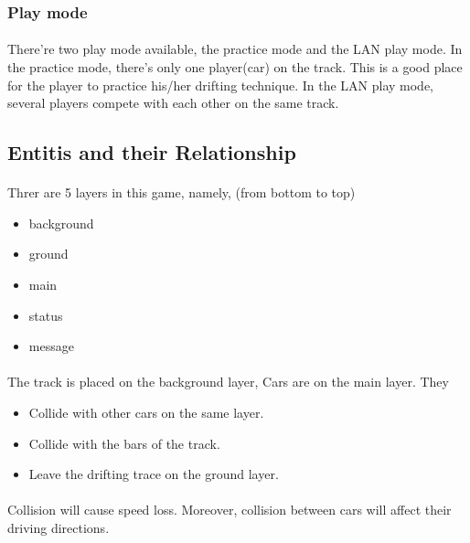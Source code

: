 \documentclass{article}
\begin{document}
        \subsubsection*{Play mode}
        \paragraph{}
            There're two play mode available, the practice mode and the LAN play mode.
            In the practice mode, there's only one player(car) on the track. This is a good place for the player to practice his/her drifting technique.
            In the LAN play mode, several players compete with each other on the same track.
    \subsection{Entitis and their Relationship}
    \paragraph{}
        Threr are 5 layers in this game, namely, (from bottom to top)
    \\
        \begin{itemize}
            \item background
            \item ground
            \item main
            \item status
            \item message
        \end{itemize}
    \paragraph{}
        The track is placed on the background layer, Cars are on the main layer. They
    \\
        \begin{itemize}
            \item Collide with other cars on the same layer.
            \item Collide with the bars of the track.
            \item Leave the drifting trace on the ground layer.
        \end{itemize}
    \paragraph{}
        Collision will cause speed loss. Moreover, collision between cars will affect their driving directions.
\end{document}
